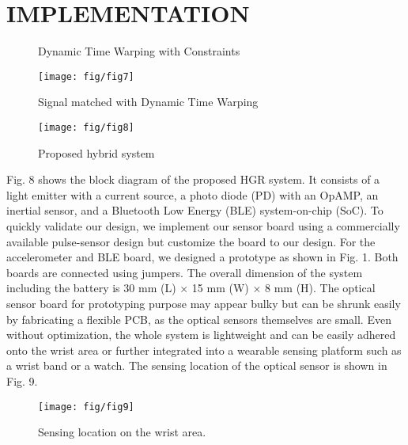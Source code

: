 \section{IMPLEMENTATION}

\begin{figure}[t]
\centering
{}
\caption{Dynamic Time Warping with Constraints}
\end{figure}

\begin{figure}[t]
\centering
\texttt{[image: fig/fig7]}
\caption{Signal matched with Dynamic Time Warping}
\end{figure}

\begin{figure}[b]
\centering
\texttt{[image: fig/fig8]}
\caption{Proposed hybrid system}
\end{figure}

Fig. 8 shows the block diagram of the proposed HGR
system. It consists of a light emitter with a current source,
a photo diode (PD) with an OpAMP, an inertial sensor, and
a Bluetooth Low Energy (BLE) system-on-chip (SoC). To
quickly validate our design, we implement our sensor board
using a commercially available pulse-sensor design \cite{c21} but
customize the board to our design. For the accelerometer and
BLE board, we designed a prototype as shown in Fig. 1. Both
boards are connected using jumpers. The overall dimension of
the system including the battery is 30 mm (L) $\times$ 15 mm (W) $\times$
8 mm (H). The optical sensor board for prototyping purpose
may appear bulky but can be shrunk easily by fabricating a
flexible PCB, as the optical sensors themselves are small. Even
without optimization, the whole system is lightweight and can
be easily adhered onto the wrist area or further integrated into
a wearable sensing platform such as a wrist band or a watch.
The sensing location of the optical sensor is shown in Fig. 9.

\begin{figure}[t]
\centering
\texttt{[image: fig/fig9]}
\caption{Sensing location on the wrist area.}
\end{figure}

